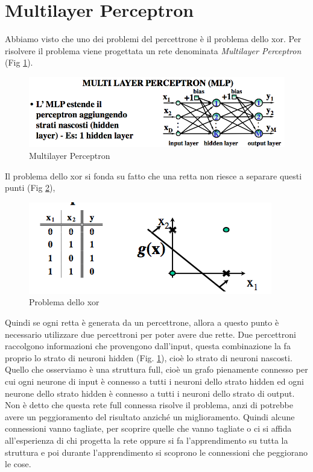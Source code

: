 \section{Multilayer Perceptron}
\noindent Abbiamo visto che uno dei problemi del percettrone è il problema dello xor. Per risolvere il problema viene progettata un rete denominata \emph{Multilayer Perceptron} (Fig \ref{mp}).
\begin{figure}
\centering
\includegraphics[scale=0.5]{img/mp.png}
\caption{Multilayer Perceptron}
\label{mp}
\end{figure}
Il problema dello xor si fonda su fatto che una retta non riesce a separare questi punti (Fig \ref{xor}),
\begin{figure}
\centering
\includegraphics[scale=0.6]{img/xor.png}
\caption{Problema dello xor}
\label{xor}
\end{figure}
Quindi se ogni retta è generata da un percettrone, allora a questo punto  è necessario utilizzare due percettroni per poter avere due rette. Due percettroni raccolgono informazioni che provengono dall'input, questa combinazione la fa proprio lo strato di neuroni hidden (Fig. \ref{mp}), cioè lo strato di neuroni nascosti. Quello che osserviamo è una struttura full, cioè un grafo pienamente connesso per cui ogni neurone di input è connesso a tutti i neuroni dello strato hidden ed ogni neurone dello strato hidden è connesso a tutti i neuroni dello strato di output. Non è detto che questa rete full connessa risolve il problema, anzi di potrebbe avere un peggioramento del risultato anziché un miglioramento. Quindi alcune connessioni vanno tagliate, per scoprire quelle che vanno tagliate o ci si affida all'esperienza di chi progetta la rete oppure si fa l'apprendimento su tutta la struttura e poi durante l'apprendimento si scoprono le connessioni che peggiorano le cose. \\

